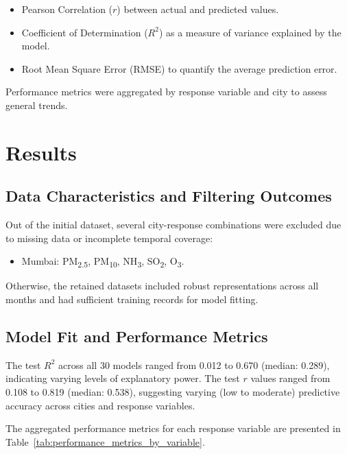 \documentclass[twoside,11pt]{article}
\begin{document}
\begin{itemize}
  \item Pearson Correlation ($r$) between actual and predicted values.
  \item Coefficient of Determination ($R^2$) as a measure of variance explained by the model.
  \item Root Mean Square Error (RMSE) to quantify the average prediction error.
\end{itemize}

Performance metrics were aggregated by response variable and city to assess general trends.

\section{Results}

\subsection{Data Characteristics and Filtering Outcomes}

Out of the initial dataset, several city-response combinations were excluded due to missing data or incomplete temporal coverage:

\begin{itemize}
  \item Mumbai: PM\textsubscript{2.5}, PM\textsubscript{10}, NH\textsubscript{3}, SO\textsubscript{2}, O\textsubscript{3}.
\end{itemize}

Otherwise, the retained datasets included robust representations across all months and had sufficient training records for model fitting.

\subsection{Model Fit and Performance Metrics}

The test $R^2$ across all 30 models ranged from 0.012 to 0.670 (median: 0.289), indicating varying levels of explanatory power. The test $r$ values ranged from 0.108 to 0.819 (median: 0.538), suggesting varying (low to moderate) predictive accuracy across cities and response variables.

The aggregated performance metrics for each response variable are presented in Table~\ref{tab:performance_metrics_by_variable}.
\end{document}
